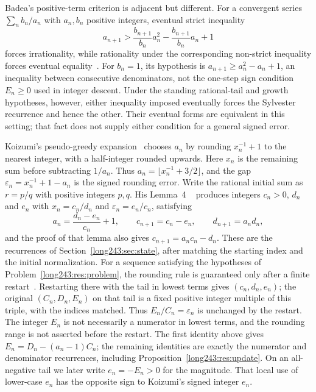 Badea's positive-term criterion is adjacent but different. For a convergent
series $\sum_n b_n/a_n$ with $a_n,b_n$ positive integers, eventual strict
inequality
\[
 a_{n+1}>\frac{b_{n+1}}{b_n}a_n^2-\frac{b_{n+1}}{b_n}a_n+1
\]
forces irrationality, while rationality under the corresponding non-strict
inequality forces eventual equality~\cite[Theorem~A, p.~313; Cor.~2.2,
p.~316]{badea1993}. For $b_n=1$, its hypothesis is
$a_{n+1}\ge a_n^2-a_n+1$, an inequality between consecutive denominators,
not the one-step sign condition $E_n\ge0$ used in integer descent.
Under the standing rational-tail and growth hypotheses, however, either
inequality imposed eventually forces the Sylvester recurrence and hence the
other. Their eventual forms are equivalent in this setting; that fact
does not supply either condition for a general signed error.

Koizumi's pseudo-greedy expansion~\cite{koizumi2025} chooses $a_n$ by
rounding $x_n^{-1}+1$ to the nearest integer, with a half-integer rounded
upwards. Here $x_n$ is the remaining sum before subtracting $1/a_n$.
Thus $a_n=\lfloor x_n^{-1}+3/2\rfloor$, and the gap
$\varepsilon_n=x_n^{-1}+1-a_n$ is the signed rounding error.
Write the rational initial sum as $r=p/q$ with positive integers $p,q$. His Lemma~4
~\cite[pp.~11--12]{koizumi2025} produces integers $c_n>0$,
$d_n$ and $e_n$ with $x_n=c_n/d_n$ and $\varepsilon_n=e_n/c_n$, satisfying
\[
 a_n=\frac{d_n-e_n}{c_n}+1,\qquad
 c_{n+1}=c_n-e_n,\qquad
 d_{n+1}=a_nd_n ,
\]
and the proof of that lemma also gives $c_{n+1}=a_nc_n-d_n$.
These are the recurrences of Section~\ref{long243:sec:state}, after
matching the starting index and the initial normalization. For a sequence
satisfying the hypotheses of Problem~\ref{long243:res:problem}, the rounding rule is guaranteed
only after a finite restart~\cite[Corollary~3, p.~9]{koizumi2025}. Restarting there
with the tail in lowest terms gives $(c_n,d_n,e_n)$; the original
$(C_n,D_n,E_n)$ on that tail is a fixed positive integer multiple of
this triple, with the indices matched. Thus $E_n/C_n=\varepsilon_n$
is unchanged by the restart. The integer $E_n$ is not necessarily a
numerator in lowest terms, and the rounding range is not asserted
before the restart. The first identity
above gives $E_n=D_n-(a_n-1)C_n$; the remaining identities are exactly
the numerator and denominator recurrences, including
Proposition~\ref{long243:res:update}. On an all-negative tail we later
write $e_n=-E_n>0$ for the magnitude. That local use of lower-case $e_n$
has the opposite sign to Koizumi's signed integer $e_n$.

